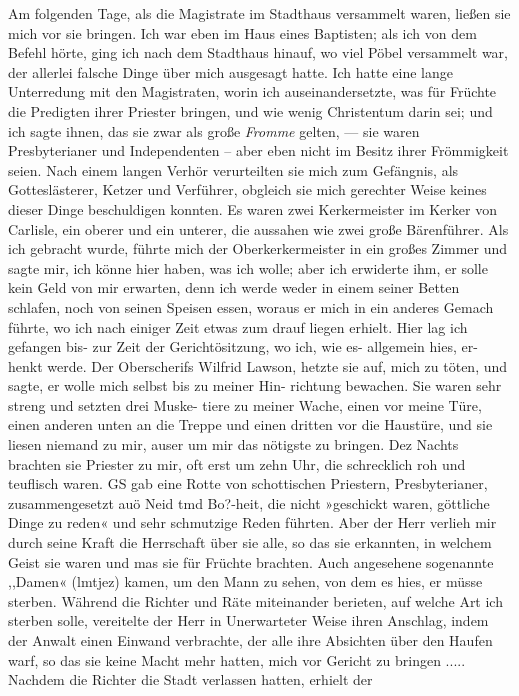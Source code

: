 Am folgenden Tage, als die
Magistrate im Stadthaus versammelt waren, ließen sie mich vor
sie bringen. Ich war eben im Haus eines Baptisten; als ich
von dem Befehl hörte, ging ich nach dem Stadthaus hinauf, wo
viel Pöbel versammelt war, der allerlei falsche Dinge über mich
ausgesagt hatte. Ich hatte eine lange Unterredung mit den
Magistraten, worin ich auseinandersetzte, was für Früchte die
Predigten ihrer Priester bringen, und wie wenig Christentum darin
sei; und ich sagte ihnen, das sie zwar als große \textit{Fromme}
gelten, — sie waren Presbyterianer 
und Independenten -- aber
eben nicht im Besitz ihrer Frömmigkeit seien. Nach einem langen
Verhör verurteilten sie mich zum Gefängnis, als Gotteslästerer,
Ketzer und Verführer, obgleich sie mich gerechter Weise keines
dieser Dinge beschuldigen konnten. Es waren zwei Kerkermeister
im Kerker von Carlisle, ein oberer und ein 
unterer, die aussahen wie zwei große Bärenführer. 
Als ich gebracht wurde,
führte mich der Oberkerkermeister in ein großes Zimmer und sagte
mir, ich könne hier haben, was ich wolle; aber ich erwiderte
ihm, er solle kein Geld von mir erwarten, denn ich werde weder
in einem seiner Betten schlafen, noch von seinen Speisen essen,
woraus er mich in ein anderes Gemach führte, wo ich nach einiger
Zeit etwas zum drauf liegen erhielt. Hier lag ich gefangen bis-
zur Zeit der Gerichtösitzung, wo ich, wie es- allgemein hies, er-
henkt werde. Der Oberscherifs Wilfrid Lawson, hetzte sie auf,
mich zu töten, und sagte, er wolle mich selbst bis zu meiner Hin-
richtung bewachen. Sie waren sehr streng und setzten drei Muske-
tiere zu meiner Wache, einen vor meine Türe, einen anderen
unten an die Treppe und einen dritten vor die Haustüre, und
sie liesen niemand zu mir, auser um mir das nötigste zu bringen.
Dez Nachts brachten sie Priester zu mir, oft erst um zehn Uhr,
die schrecklich roh und teuflisch waren. GS gab eine Rotte von
schottischen Priestern, Presbyterianer, zusammengesetzt auö Neid
tmd Bo?-heit, die nicht »geschickt waren, göttliche Dinge zu reden«
und sehr schmutzige Reden führten. Aber der Herr verlieh mir
durch seine Kraft die Herrschaft über sie alle, so das sie erkannten,
in welchem Geist sie waren und mas sie für Früchte brachten.
Auch angesehene sogenannte ,,Damen« (lmtjez) kamen, um den
Mann zu sehen, von dem es hies, er müsse sterben. Während
die Richter und Räte miteinander berieten, auf welche Art ich
sterben solle, vereitelte der Herr in Unerwarteter Weise ihren
Anschlag, indem der Anwalt einen Einwand verbrachte, der
alle ihre Absichten über den Haufen warf, so das sie keine
Macht mehr hatten, mich vor Gericht zu bringen .....
Nachdem die Richter die Stadt verlassen hatten, erhielt der


